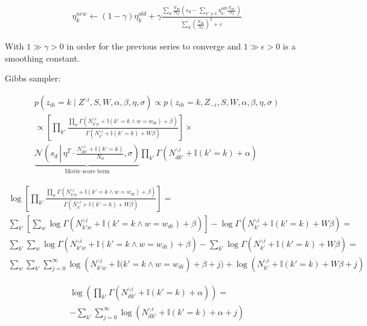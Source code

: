 \documentclass[a4paper,10pt]{report}
\begin{document}
\begin{multline*}
\eta_k^{new} \leftarrow (1 - \gamma) \eta_k^{old} + \gamma \frac{\sum_d \frac{N_{dk}}{N_d} \left( s_d - \sum_{k' \ne k} \eta_{k'}^{old} \frac{N_{dk'}}{N_d} \right)}{\sum_d \left( \frac{N_{dk}}{N_d}  \right)^2 + \varepsilon}
\end{multline*}

With $1 \gg \gamma > 0$ in order for the previous series to converge and $1 \gg \epsilon > 0$ is a smoothing constant.

Gibbs sampler:

\begin{multline*}
p(z_{di} = k \mid Z^{\backslash i}, S, W, \alpha, \beta, \eta, \sigma) \propto p(z_{di} = k, Z_{-i}, S, W, \alpha, \beta, \eta, \sigma) \\
\propto \left[ \prod_{k'} \frac{\prod_w \Gamma(N_{{k'}w}^{\backslash i} + \mathbb{I}(k' = k \wedge w = w_{di}) + \beta)}{\Gamma(N_{k'}^{\backslash i} + \mathbb{I}(k' = k) + W \beta)} \right] \times \\
\underbrace{\mathcal{N}\left(s_d\, \left|\, \eta^T \cdot \frac{N_{d{k'}}^{\backslash i} + \mathbb{I}(k' = k)}{N_d}, \sigma\right. \right)}_\text{Movie score term} \prod_{k'} \Gamma(N_{d{k'}}^{\backslash i} + \mathbb{I}(k' = k) + \alpha)
\end{multline*}

\begin{multline*}
\log \left[ \prod_{k'} \frac{\prod_w \Gamma(N_{{k'}w}^{\backslash i} + \mathbb{I}(k' = k \wedge w = w_{di}) + \beta)}{\Gamma(N_{k'}^{\backslash i} + \mathbb{I}(k' = k) + W \beta)} \right] = \\
\sum_{k'} \left[ \sum_w \log \Gamma(N_{{k'}w}^{\backslash i} + \mathbb{I}(k' = k \wedge w = w_{di}) + \beta) \right] - \log \Gamma(N_{k'}^{\backslash i} + \mathbb{I}(k' = k) + W \beta) = \\
\sum_{k'} \sum_w \log \Gamma(N_{{k'}w}^{\backslash i} + \mathbb{I}(k' = k \wedge w = w_{di}) + \beta) - \sum_{k'} \log \Gamma(N_{k'}^{\backslash i} + \mathbb{I}(k' = k) + W \beta) = \\
\sum_w \sum_{k'} \sum_{j = 0}^\infty \log \left(N_{{k'}w}^{\backslash i} + \mathbb{I}(k' = k \wedge w = w_{di}\right) + \beta + j) + \log \left(N_{k'}^{\backslash i} + \mathbb{I}(k' = k) + W \beta + j\right)
\end{multline*}

\begin{multline*}
 \log \left( \prod_{k'} \Gamma(N_{d{k'}}^{\backslash i} + \mathbb{I}(k' = k) + \alpha) \right) =\\
- \sum_{k'} \sum_{j = 0}^\infty \log (N_{dk'}^{\backslash i} + \mathbb{I}(k' = k) + \alpha + j)
\end{multline*}
 
\end{document}
